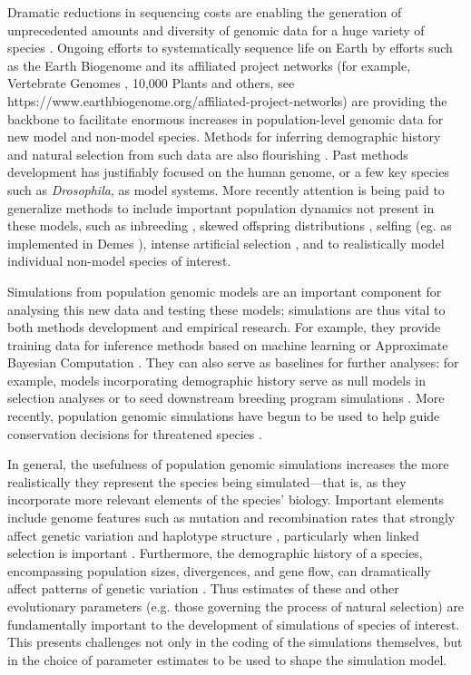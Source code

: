 \documentclass[hidelinks]{article}
\begin{document}
Dramatic reductions in sequencing costs are enabling the generation of
unprecedented amounts and diversity of genomic data for a huge variety of species
\citep{Ellegren2014}. Ongoing efforts to systematically sequence life on
Earth by efforts such as the Earth Biogenome \citep{Lewin2022} and its
affiliated project networks (for example, Vertebrate Genomes
\citep{Rhie2021}, 10,000 Plants \citep{Cheng2018} and others, see
https://www.earthbiogenome.org/affiliated-project-networks) are
providing the backbone to facilitate enormous increases in population-level genomic data for
new model and non-model species. Methods for inferring
demographic history and natural selection from such data are also flourishing
\citep{Beichman2018}. Past methods development has justifiably focused on the
human genome, or a few key species such as \emph{Drosophila}, 
as model systems. More recently attention is being paid to
generalize methods to include important population dynamics not present
in these models, such as inbreeding \citep{Blischak2020}, skewed offspring
distributions \citep{Montano2016}, selfing (eg. as implemented in Demes
\citep{Gower2022}), intense artificial selection \citep{MacLeod2013,
MacLeod2014}, and to realistically model individual non-model species of interest.

Simulations from population genomic models are an important component
for analysing this new data and testing these models; simulations are thus vital to both methods
development and empirical research. For example, they provide training
data for inference methods based on machine learning \citep{Schrider2018} or
Approximate Bayesian Computation \citep{Csillery2010}. They can also serve as
baselines for further analyses: for example, models incorporating
demographic history serve as null models in selection analyses
\citep{Hsieh2016a} or to seed downstream breeding program simulations
\citep{Gaynor2020}. More recently, population genomic simulations have begun
to be used to help guide conservation decisions for threatened species
\citep{Teixeira2021}.

In general, the usefulness of population genomic simulations increases
the more realistically they represent the species being simulated---that
is, as they incorporate more relevant elements of the species' biology. Important
elements include genome features such as mutation and recombination
rates that strongly affect genetic variation and haplotype structure
\citep{Nachman2002}, particularly when linked selection is important \citep{Cutter2013}. 
Furthermore, the demographic history of a
species, encompassing population sizes, divergences, and gene flow, can
dramatically affect patterns of genetic variation \citep{Teshima2006}. Thus
estimates of these and other evolutionary parameters (e.g. those governing
the process of natural selection) are fundamentally important to the
development of simulations of species of interest. This presents
challenges not only in the coding of the simulations themselves, but in
the choice of parameter estimates to be used to shape the simulation
model.
\end{document}
